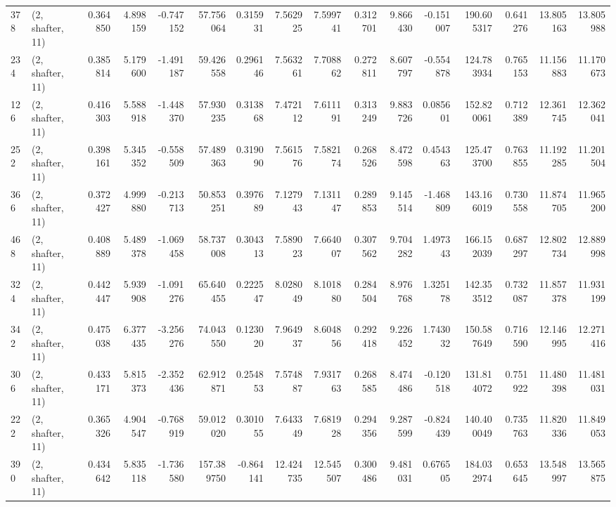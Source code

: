 \begin{tabular}{llrrrrrrrrrrrrrr}
378 &  (2, shafter, 11) &   0.364850 &   4.898159 &  -0.747152 &    57.756064 &   0.315931 &   7.562925 &   7.599741 &  0.312701 &   9.866430 &  -0.151007 &   190.605317 &  0.641276 &  13.805163 &  13.805988 \\
234 &  (2, shafter, 11) &   0.385814 &   5.179600 &  -1.491187 &    59.426558 &   0.296146 &   7.563261 &   7.708862 &  0.272811 &   8.607797 &  -0.554878 &   124.783934 &  0.765153 &  11.156883 &  11.170673 \\
126 &  (2, shafter, 11) &   0.416303 &   5.588918 &  -1.448370 &    57.930235 &   0.313868 &   7.472112 &   7.611191 &  0.313249 &   9.883726 &   0.085601 &   152.820061 &  0.712389 &  12.361745 &  12.362041 \\
252 &  (2, shafter, 11) &   0.398161 &   5.345352 &  -0.558509 &    57.489363 &   0.319090 &   7.561576 &   7.582174 &  0.268526 &   8.472598 &   0.454363 &   125.473700 &  0.763855 &  11.192285 &  11.201504 \\
366 &  (2, shafter, 11) &   0.372427 &   4.999880 &  -0.213713 &    50.853251 &   0.397689 &   7.127943 &   7.131147 &  0.289853 &   9.145514 &  -1.468809 &   143.166019 &  0.730558 &  11.874705 &  11.965200 \\
468 &  (2, shafter, 11) &   0.408889 &   5.489378 &  -1.069458 &    58.737008 &   0.304313 &   7.589023 &   7.664007 &  0.307562 &   9.704282 &   1.497343 &   166.152039 &  0.687297 &  12.802734 &  12.889998 \\
324 &  (2, shafter, 11) &   0.442447 &   5.939908 &  -1.091276 &    65.640455 &   0.222547 &   8.028049 &   8.101880 &  0.284504 &   8.976768 &   1.325178 &   142.353512 &  0.732087 &  11.857378 &  11.931199 \\
342 &  (2, shafter, 11) &   0.475038 &   6.377435 &  -3.256276 &    74.043550 &   0.123020 &   7.964937 &   8.604856 &  0.292418 &   9.226452 &   1.743032 &   150.587649 &  0.716590 &  12.146995 &  12.271416 \\
306 &  (2, shafter, 11) &   0.433171 &   5.815373 &  -2.352436 &    62.912871 &   0.254853 &   7.574887 &   7.931763 &  0.268585 &   8.474486 &  -0.120518 &   131.814072 &  0.751922 &  11.480398 &  11.481031 \\
222 &  (2, shafter, 11) &   0.365326 &   4.904547 &  -0.768919 &    59.012020 &   0.301055 &   7.643349 &   7.681928 &  0.294356 &   9.287599 &  -0.824439 &   140.400049 &  0.735763 &  11.820336 &  11.849053 \\
390 &  (2, shafter, 11) &   0.434642 &   5.835118 &  -1.736580 &   157.389750 &  -0.864141 &  12.424735 &  12.545507 &  0.300486 &   9.481031 &   0.676505 &   184.032974 &  0.653645 &  13.548997 &  13.565875 \\

\end{tabular}

